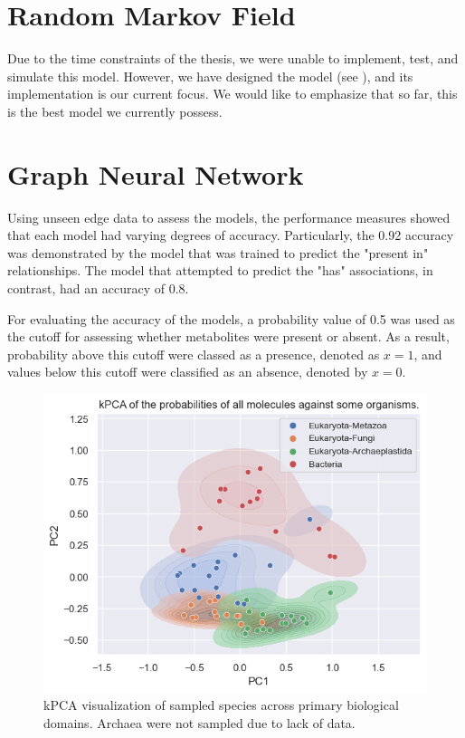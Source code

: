 \documentclass[
11pt, %
oneside, %
english, %
singlespacing, %
headsepline, %
chapterinoneline, %
]{MastersDoctoralThesis} %
\begin{document}
\section{Random Markov Field}
Due to the time constraints of the thesis, we were unable to implement, test, and simulate this model. However, we have designed the model (see ), and its implementation is our current focus. We would like to emphasize that so far, this is the best model we currently possess.

\section{Graph Neural Network}
Using unseen edge data to assess the models, the performance measures showed that each model had varying degrees of accuracy. Particularly, the 0.92 accuracy was demonstrated by the model that was trained to predict the "present in" relationships. The model that attempted to predict the "has" associations, in contrast, had an accuracy of 0.8.

For evaluating the accuracy of the models, a probability value of 0.5 was used as the cutoff for assessing whether metabolites were present or absent. As a result, probability above this cutoff were classed as a presence, denoted as $x=1$, and values below this cutoff were classified as an absence, denoted by $x=0$.

\begin{figure}[h]
	\centering
	\includegraphics[scale=0.7]{figure/kPCA}
	\caption{kPCA visualization of sampled species across primary biological domains. Archaea were not sampled due to lack of data.}
	\label{fig:kPCA}
\end{figure}
\end{document}
